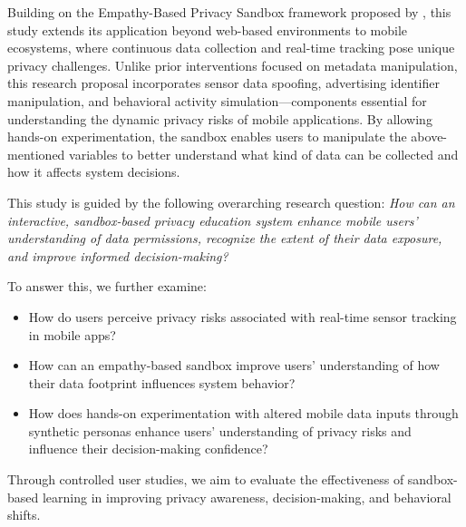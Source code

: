 \documentclass[acmlarge, nonacm]{acmart}
\begin{document}
Building on the Empathy-Based Privacy Sandbox framework proposed by \citet{Chaoran2023EmpathySandbox}, this study extends its application beyond web-based environments to mobile ecosystems, where continuous data collection and real-time tracking pose unique privacy challenges. Unlike prior interventions focused on metadata manipulation, this research proposal incorporates sensor data spoofing, advertising identifier manipulation, and behavioral activity simulation—components essential for understanding the dynamic privacy risks of mobile applications. By allowing hands-on experimentation, the sandbox enables users to manipulate the above-mentioned variables to better understand what kind of data can be collected and how it affects system decisions.

This study is guided by the following overarching research question: \textit{How can an interactive, sandbox-based privacy education system enhance mobile users' understanding of data permissions, recognize the extent of their data exposure, and improve informed decision-making?}

To answer this, we further examine:
\begin{itemize}
    \item How do users perceive privacy risks associated with real-time sensor tracking in mobile apps?
    \item How can an empathy-based sandbox improve users’ understanding of how their data footprint influences system behavior?
    \item How does hands-on experimentation with altered mobile data inputs through synthetic personas enhance users’ understanding of privacy risks and influence their decision-making confidence?
\end{itemize}

Through controlled user studies, we aim to evaluate the effectiveness of sandbox-based learning in improving privacy awareness, decision-making, and behavioral shifts. 


\end{document}
